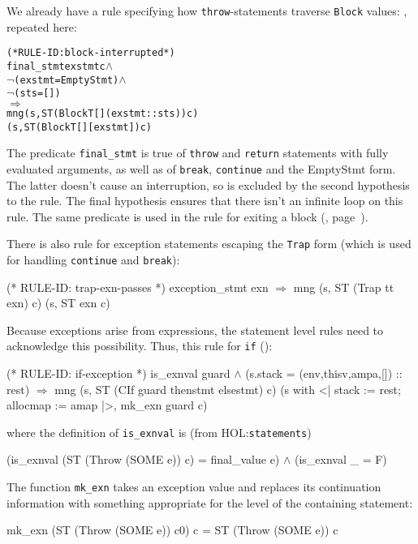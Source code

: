 \documentclass[11pt]{article}
\newcommand{\HOLfile}[1]{HOL:\texttt{#1}}
\begin{document}
We already have a rule specifying how \texttt{throw}-statements traverse
\texttt{Block} values: , repeated here:
\begin{center}
\begin{minipage}{\textwidth}
\begin{alltt}
(* RULE-ID: block-interrupted *)
     final_stmt exstmt c \(\land\)
     \(\neg\)(exstmt = EmptyStmt) \(\land\)
     \(\neg\)(sts = [])
   \(\Rightarrow\)
     mng (s, ST (Block T [] (exstmt::sts)) c)
         (s, ST (Block T [] [exstmt]) c)
\end{alltt}
\end{minipage}
\end{center}
The predicate \texttt{final_stmt} is true of \texttt{throw} and
\texttt{return} statements with fully evaluated arguments, as well as
of \texttt{break}, \texttt{continue} and the \textsf{EmptyStmt} form.
The latter doesn't cause an interruption, so is excluded by the second
hypothesis to the rule.  The final hypothesis ensures that there isn't
an infinite loop on this rule.  The same predicate is used in the rule
for exiting a block (, page~\pageref{fig:block-exit}).

There is also rule  for exception statements
escaping the \texttt{Trap} form (which is used for handling
\texttt{continue} and \texttt{break}):%
%
\begin{stdrule}
(* RULE-ID: trap-exn-passes *)
     exception_stmt exn
   \(\Rightarrow\)
     mng (s, ST (Trap tt exn) c) (s, ST exn c)
\end{stdrule}

\medskip
Because exceptions arise from expressions, the statement level rules
need to acknowledge this possibility.  Thus, this rule for
\texttt{if} ():%
%
%
\begin{stdrule}
(* RULE-ID: if-exception *)
     is_exnval guard \(\land\)
     (s.stack = (env,thisv,ampa,[]) :: rest)
   \(\Rightarrow\)
     mng (s, ST (CIf guard thenstmt elsestmt) c)
         (s with <| stack := rest; allocmap := amap |>,
          mk_exn guard c)
\end{stdrule}
where the definition of \texttt{is_exnval} is (from
\HOLfile{statements})
\begin{stdrule}
   (is_exnval (ST (Throw (SOME e)) c) = final_value e) \(\land\)
   (is_exnval _ = F)
\end{stdrule}
The function \texttt{mk_exn} takes an exception value and
replaces its continuation information with something appropriate for
the level of the containing statement: 
\begin{stdrule}
   mk_exn (ST (Throw (SOME e)) c0) c = ST (Throw (SOME e)) c
\end{stdrule}
\end{document}
